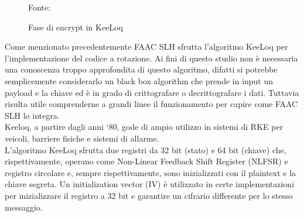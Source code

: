 \begin{figure} %
  \centering
  \def\stackalignment{r} %
  {\scriptsize \parbox[t]{\linewidth}{ Fonte: \cite{keeloqwiki}} }
  \caption{Fase di encrypt in KeeLoq}
  \label{fig:keeloq_encrypt}
\end{figure}
Come menzionato precedentemente FAAC SLH sfrutta l’algoritmo KeeLoq per l’implementazione del codice a rotazione. Ai fini di questo studio non è necessaria una conoscenza troppo approfondita di questo algoritmo, difatti si potrebbe semplicemente considerarlo un black box algorithm che prende in input un payload e la chiave ed è in grado di crittografare o decrittografare i dati. Tuttavia risulta utile comprenderne a grandi linee il funzionamento per capire come FAAC SLH lo integra.\\
Keeloq, a partire dagli anni ‘80, gode di ampio utilizzo in sistemi di RKE per veicoli, barriere fisiche e sistemi di allarme.\\
L’algoritmo KeeLoq sfrutta due registri da 32 bit (stato) e 64 bit (chiave) che, rispettivamente, operano come Non-Linear Feedback Shift Register (NLFSR) e registro circolare e, sempre rispettivamente, sono inizializzati con il plaintext e la chiave segreta. Un initialization vector (IV) è utilizzato in certe implementazioni per inizializzare il registro a 32 bit e garantire un cifrario differente per lo stesso messaggio.
